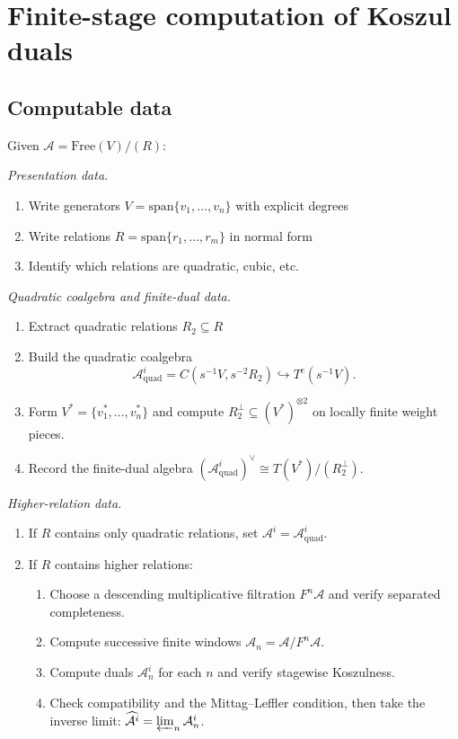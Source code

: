 
\section{Finite-stage computation of Koszul duals}
\label{sec:practical-computation}

\subsection{Computable data}

\begin{procedure}\label{proc:compute-koszul-dual}
Given $\mathcal{A} = \text{Free}(V) / (R)$:

\emph{Presentation data.}
\begin{enumerate}
\item Write generators $V = \text{span}\{v_1, \ldots, v_n\}$ with explicit degrees
\item Write relations $R = \text{span}\{r_1, \ldots, r_m\}$ in normal form
\item Identify which relations are quadratic, cubic, etc.
\end{enumerate}

\emph{Quadratic coalgebra and finite-dual data.}
\begin{enumerate}
\item Extract quadratic relations $R_2 \subseteq R$
\item Build the quadratic coalgebra
 \[
 \mathcal{A}^i_{\text{quad}}
 =C(s^{-1}V,s^{-2}R_2)\hookrightarrow T^c(s^{-1}V).
 \]
\item Form $V^*=\{v_1^*,\ldots,v_n^*\}$ and compute
 $R_2^\perp\subseteq(V^*)^{\otimes2}$ on locally finite weight pieces.
\item Record the finite-dual algebra
 $(\mathcal A^i_{\mathrm{quad}})^\vee
 \cong T(V^*)/(R_2^\perp)$.
\end{enumerate}

\emph{Higher-relation data.}
\begin{enumerate}
\item If $R$ contains only quadratic relations, set
 $\mathcal{A}^i = \mathcal{A}^i_{\text{quad}}$.
\item If $R$ contains higher relations:
 \begin{enumerate}
 \item Choose a descending multiplicative filtration $F^n\mathcal A$
 and verify separated completeness.
 \item Compute successive finite windows
 $\mathcal{A}_n = \mathcal{A} / F^n\mathcal A$.
 \item Compute duals $\mathcal{A}_n^i$ for each $n$ and verify
 stagewise Koszulness.
 \item Check compatibility and the Mittag--Leffler condition, then take
 the inverse limit:
 $\widehat{\mathcal{A}^i} = \varprojlim_n \mathcal{A}_n^i$.
 \end{enumerate}
\end{enumerate}


\end{procedure}
